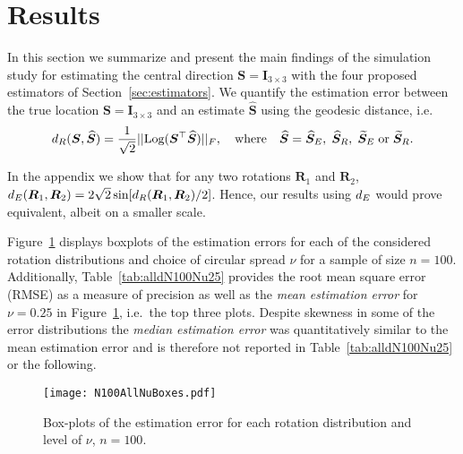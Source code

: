 \section{Results}\label{sec:results}

In this section we summarize and present the main findings of the simulation study for  estimating the central direction $\bm S = \bm I_{3\times 3}$ with the four proposed estimators of Section~\ref{sec:estimators}. We quantify the estimation error between the true location $\bm S = \bm I_{3\times 3}$ and an estimate $\widehat{\bm S}$ using the geodesic distance, i.e.  
\begin{equation}
{d_R}(\bm{S}, \widehat{\bm{S}}) =  \frac{1}{\sqrt{2}}||
\text{Log}(\bm{S}^\top\widehat{\bm{S}})||_F, \quad \mbox{where} \quad \widehat{\bm{S}} =  {\widehat{\bm S}_E}, \; {\widehat{\bm S}_R},\;  {\widetilde{\bm S}_E} \; \mbox{or} \; {\widetilde{\bm S}_R}.
\end{equation}

\noindent In the appendix we show that for any two rotations $\bm R_1$ and $\bm R_2$, ${d_E}(\bm R_1,\bm R_2)=2\sqrt{2}\sin[{d_R}(\bm R_1,\bm R_2)/2]$.  Hence, our results using ${d_E}$ would prove equivalent, albeit on a smaller scale.   

Figure~\ref{fig:NuBoxes} displays boxplots of the estimation errors for each of the considered rotation distributions and choice of circular spread $\nu$ for a sample of size  $n=100$.  Additionally,  Table~\ref{tab:alldN100Nu25} provides the root mean square error (RMSE) as a measure of precision as well as the \textit{mean estimation error} for $\nu=0.25$ in Figure~\ref{fig:NuBoxes}, i.e.~the top three plots. Despite skewness in some of  the error distributions the \textit{median estimation error} was quantitatively similar to the mean estimation error and is therefore not reported in Table~\ref{tab:alldN100Nu25} or the following.
\begin{figure}[h!]
\centering
\texttt{[image: N100AllNuBoxes.pdf]}
\caption{Box-plots of the estimation error for each rotation distribution and level of $\nu$,  $n=100$.}
\label{fig:NuBoxes}
\end{figure}

